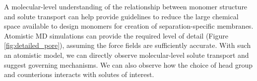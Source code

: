 %
  
  A molecular-level understanding of the relationship between monomer structure
  and solute transport can help provide guidelines to reduce the large chemical 
  space available to design monomers for creation of separation-specific membranes. 
  Atomistic MD simulations can provide the required level of detail (Figure 
  \ref{fig:detailed_pore}), assuming the force fields are sufficiently accurate. 
  With such an atomistic model, we can directly observe molecular-level solute 
  transport and suggest governing mechanisms. We can also observe how the choice 
  of head group and counterions interacts with solutes of interest. 

